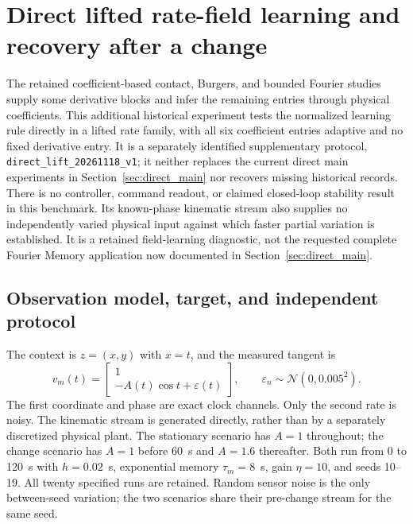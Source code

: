 \newtheorem{directproposition}{Proposition}
\renewcommand{\thedirectproposition}{S.D\arabic{directproposition}}

\section{Direct lifted rate-field learning and recovery after a change}
\label{sec:direct_lift_results}
The retained coefficient-based contact, Burgers, and bounded Fourier studies
supply some derivative blocks and infer the remaining entries through physical
coefficients. This additional historical experiment
tests the normalized learning rule directly in a lifted rate family, with
all six coefficient entries adaptive and no fixed derivative entry.
It is a separately identified supplementary protocol,
\texttt{direct\_lift\_20261118\_v1}; it neither replaces the current direct
main experiments in Section~\ref{sec:direct_main} nor recovers missing
historical records. There is no controller,
command readout, or claimed closed-loop stability result in this benchmark.
Its known-phase kinematic stream also supplies no independently varied
physical input against which faster partial variation is established.
It is a retained field-learning diagnostic, not the requested complete
Fourier Memory application now documented in Section~\ref{sec:direct_main}.

\subsection{Observation model, target, and independent protocol}
The context is $z=(x,y)$ with $x=t$, and the measured tangent is
\begin{equation}
 v_m(t)=\begin{bmatrix}1\\-A(t)\cos t+\varepsilon(t)\end{bmatrix},
 \qquad \varepsilon_n\sim\mathcal N(0,0.005^2).
 \label{eq:direct_observations}
\end{equation}
The first coordinate and phase are exact clock channels. Only the second
rate is noisy. The kinematic stream is generated directly, rather than
by a separately discretized physical plant. The stationary scenario has
$A=1$ throughout; the change scenario has $A=1$ before 60~s and $A=1.6$
thereafter. Both run from 0 to 120~s with $h=0.02$~s, exponential memory
$\tau_m=8$~s, gain $\eta=10$, and seeds 10--19. All twenty specified
runs are retained. Random sensor noise is the only between-seed variation;
the two scenarios share their pre-change stream for the same seed.

